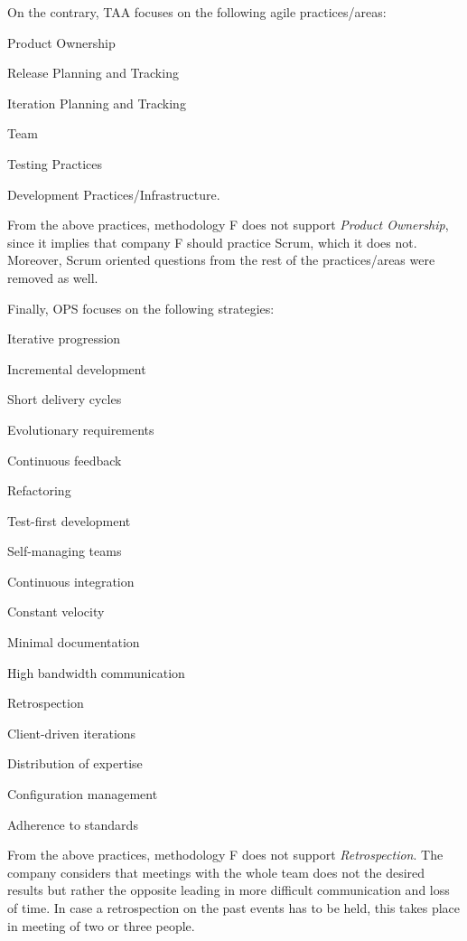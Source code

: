 On the contrary, TAA focuses on the following agile practices/areas:
\begin{inparaenum} [a\upshape)]
	\item Product Ownership
	\item Release Planning and Tracking
	\item Iteration Planning and Tracking
	\item Team
	\item Testing Practices
	\item Development Practices/Infrastructure.
\end{inparaenum}
From the above practices, methodology F does not support \textit{Product Ownership}, since it implies that company F should practice Scrum, which it does not. Moreover, Scrum oriented questions from the rest of the practices/areas were removed as well. 

Finally, OPS focuses on the following strategies:
\begin{inparaenum} [a\upshape)]
	\item Iterative progression
	\item Incremental development
	\item Short delivery cycles
	\item Evolutionary requirements
	\item Continuous feedback
	\item Refactoring
	\item Test-first development
	\item Self-managing teams
	\item Continuous integration
	\item Constant velocity
	\item Minimal documentation
	\item High bandwidth communication
	\item Retrospection
	\item Client-driven iterations
	\item Distribution of expertise
	\item Configuration management
	\item Adherence to standards

\end{inparaenum}
From the above practices, methodology F does not support \textit{Retrospection}. The company considers that meetings with the whole team does not the desired results but rather the opposite leading in more difficult communication and loss of time. In case a retrospection on the past events has to be held, this takes place in meeting of two or three people.

